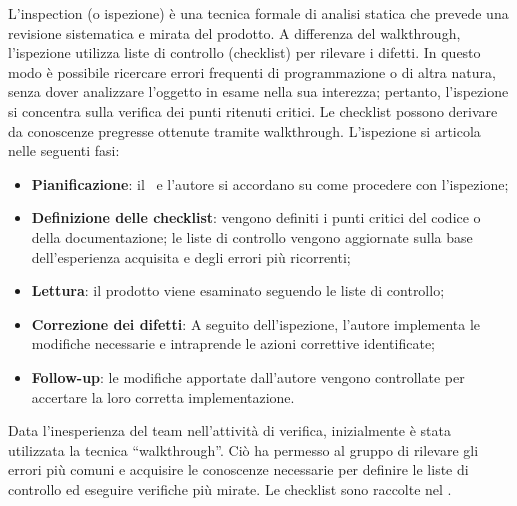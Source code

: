 \par L'inspection (o ispezione) è una tecnica formale di analisi statica che prevede una revisione sistematica e mirata del prodotto. A differenza del walkthrough, l’ispezione utilizza liste di controllo (checklist) per rilevare i difetti. In questo modo è possibile ricercare errori frequenti di programmazione o di altra natura, senza dover analizzare l’oggetto in esame nella sua interezza; pertanto, l’ispezione si concentra sulla verifica dei punti ritenuti critici. Le checklist possono derivare da conoscenze pregresse ottenute tramite walkthrough. L'ispezione si articola nelle seguenti fasi:
\begin{itemize}
  \item \textbf{Pianificazione}: il \Verificatore\ e l'autore si accordano su come procedere con l'ispezione;
  \item \textbf{Definizione delle checklist}: vengono definiti i punti critici del codice o della documentazione; le liste di controllo vengono aggiornate sulla base dell’esperienza acquisita e degli errori più ricorrenti;
  \item \textbf{Lettura}: il prodotto viene esaminato seguendo le liste di controllo;
  \item \textbf{Correzione dei difetti}: A seguito dell'ispezione, l'autore implementa le modifiche necessarie e intraprende le azioni correttive identificate;
  \item \textbf{Follow-up}: le modifiche apportate dall'autore vengono controllate per accertare la loro corretta implementazione.
\end{itemize}

\vspace{0.5\baselineskip}
\par Data l’inesperienza del team nell'attività di verifica, inizialmente è stata utilizzata la tecnica “walkthrough”. Ciò ha permesso al gruppo di rilevare gli errori più comuni e acquisire le conoscenze necessarie per definire le liste di controllo ed eseguire verifiche più mirate. Le checklist sono raccolte nel \PianoDiQualifica.

